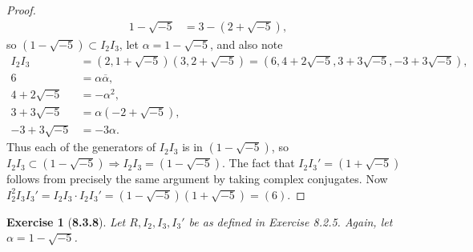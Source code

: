 \documentclass[10pt,oneside,reqno]{amsart}
\theoremstyle{plain}
\newtheorem*{e}{Exercise}
\theoremstyle{definition}
\begin{document}
\begin{enumerate}
\begin{enumerate}
\begin{proof}
\begin{equation} 
\begin{aligned}
1 - \sqrt{-5} &= 3 - (2 + \sqrt{-5}),
\end{aligned}
\end{equation}
so $(1 - \sqrt{-5}) \subset I_2I_3$, let $\alpha = 1 - \sqrt{-5}$, and also note 
\begin{equation} 
\begin{aligned}
I_2I_3 &= (2,1 + \sqrt{-5})(3, 2 + \sqrt{-5}) = (6, 4 + 2\sqrt{-5},3 + 3\sqrt{-5}, -3 + 3\sqrt{-5}),\\
6 &= \alpha \overline{\alpha},\\
4 + 2\sqrt{-5} &= -\alpha^2,\\
3 + 3\sqrt{-5} &= \alpha(-2 + \sqrt{-5}),\\
-3 + 3\sqrt{-5} &= -3\alpha.
\end{aligned}
\end{equation}
Thus each of the generators of $I_2I_3$ is in $(1 - \sqrt{-5})$, so $I_2I_3 \subset (1 - \sqrt{-5}) \Rightarrow I_2I_3 = (1 - \sqrt{-5})$. The fact that $I_2I_3' = (1 + \sqrt{-5})$ follows from precisely the same argument by taking complex conjugates. Now $I_2^2I_3I_3' = I_2I_3 \cdot I_2I_3' = (1 - \sqrt{-5})(1 + \sqrt{-5}) = (6)$. 
\end{proof}

\end{enumerate}

\end{enumerate}
\vspace{3mm}

\begin{e}[\textbf{8.3.8}]
Let $R, I_2, I_3, I_3'$ be as defined in Exercise 8.2.5. Again, let $\alpha = 1 - \sqrt{-5}$. 
\end{e}
\end{document}
